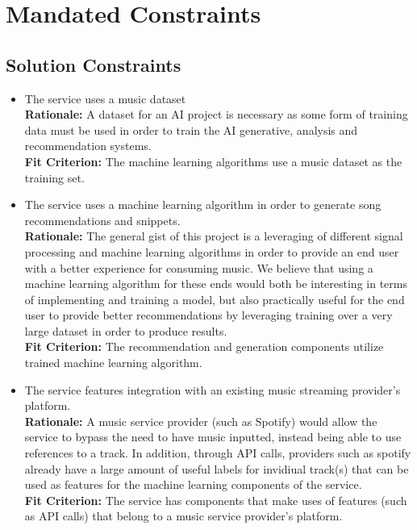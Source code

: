 \documentclass[12pt]{article}
\begin{document}
\section{Mandated Constraints}
\subsection{Solution Constraints}
\begin{itemize}

  \item The service uses a music dataset
  \\ \textbf{Rationale:} A dataset for an AI project is necessary as some form of training data must be used 
  in order to train the AI generative, analysis and recommendation systems. 
  \\ \textbf{Fit Criterion:} The machine learning algorithms use a music dataset as the training set. 

  \item The service uses a machine learning algorithm in order to generate song recommendations and snippets. 
  \\ \textbf{Rationale:} The general gist of this project is a leveraging of different signal processing and machine learning
  algorithms in order to provide an end user with a better experience for consuming music. We believe that using a machine 
  learning algorithm for these ends would both be interesting in terms of implementing and training a model, but also practically
  useful for the end user to provide better recommendations by leveraging training over a very large dataset in order to produce results. 
  \\\textbf{Fit Criterion:} The recommendation and generation components utilize trained machine learning algorithm. 

  \item The service features integration with an existing music streaming provider's platform. 
  \\ \textbf{Rationale:} A music service provider (such as Spotify) would allow the service to bypass the need to have
  music inputted, instead being able to use references to a track. In addition, through API calls, providers such as spotify
  already have a large amount of useful labels for invidiual track(s) that can be used as features for the machine learning
  components of the service.  
  \\ \textbf{Fit Criterion:} The service has components that make uses of features (such as API calls) 
  that belong to a music service provider's platform. 


\end{itemize}
\end{document}
